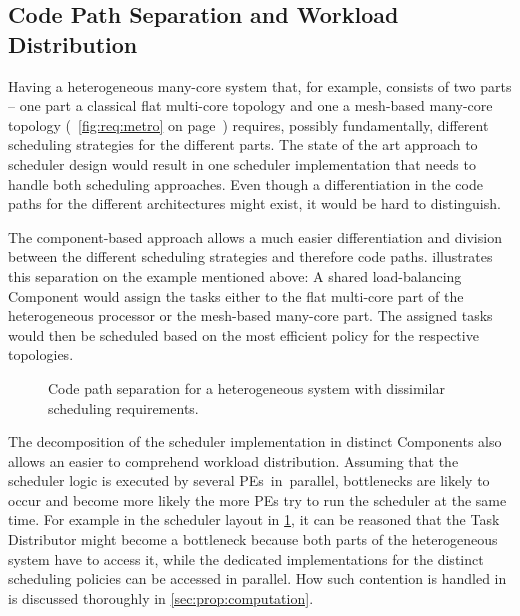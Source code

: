 \subsection{Code Path Separation and Workload Distribution}%
\label{sec:arch:components:distribution}

Having a heterogeneous many-core system that, for example, consists of two parts -- one part a classical flat multi-core topology and one a mesh-based many-core topology (\cf{}~\cref{fig:req:metro} on page~\pageref{fig:req:metro}) requires, possibly fundamentally, different scheduling strategies for the different parts. The state of the art approach to scheduler design would result in one scheduler implementation that needs to handle both scheduling approaches. Even though a differentiation in the code paths for the different architectures might exist, it would be hard to distinguish.

The component-based approach allows a much easier differentiation and division between the different scheduling strategies and therefore code paths.  illustrates this separation on the example mentioned above: A shared load-balancing Component would assign the tasks either to the flat multi-core part of the heterogeneous processor or the mesh-based many-core part. The assigned tasks would then be scheduled based on the most efficient policy for the respective topologies.

\begin{figure}[t!] \centering
	\caption[Code path separation for a heterogeneous system.]{Code path separation for a heterogeneous system with dissimilar scheduling requirements.}%
	\label{fig:arch:flow}
\end{figure}

The decomposition of the scheduler implementation in distinct Components also allows an easier to comprehend workload distribution. Assuming that the scheduler logic is executed by several \acp{PE}~in~parallel, bottlenecks are likely to occur and become more likely the more \acp{PE} try to run the scheduler at the same time. For example in the scheduler layout in \cref{fig:arch:flow}, it can be reasoned that the Task Distributor might become a bottleneck because both parts of the heterogeneous system have to access it, while the dedicated implementations for the distinct scheduling policies can be accessed in parallel. How such contention is handled in \cobas{} is discussed thoroughly in \cref{sec:prop:computation}.

